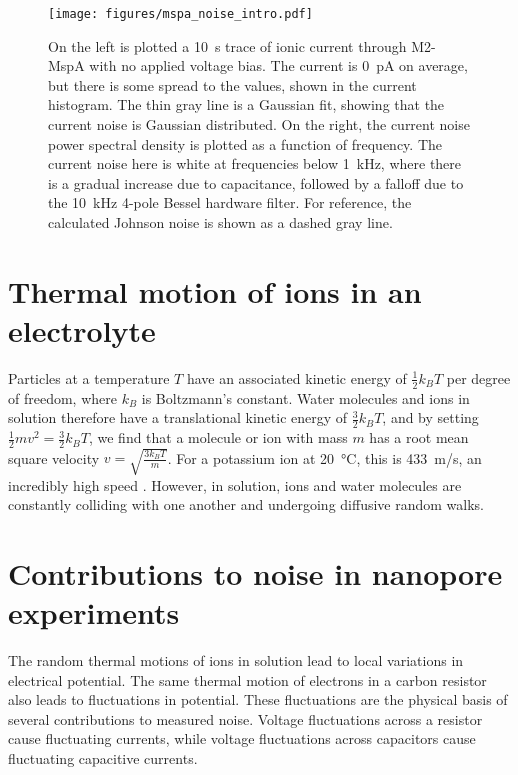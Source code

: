 \begin{figure}[h]
\begin{centering}
\texttt{[image: figures/mspa\_noise\_intro.pdf]}
\caption[Current noise in the MspA nanopore]{On the left is plotted a \SI{10}{\s} trace of ionic current through M2-MspA with no applied voltage bias.  The current is \SI{0}{\pA} on average, but there is some spread to the values, shown in the current histogram.  The thin gray line is a Gaussian fit, showing that the current noise is Gaussian distributed.  On the right, the current noise power spectral density is plotted as a function of frequency.  The current noise here is white at frequencies below \SI{1}{\kHz}, where there is a gradual increase due to capacitance, followed by a falloff due to the \SI{10}{\kHz} 4-pole Bessel hardware filter.  For reference, the calculated Johnson noise is shown as a dashed gray line.}
\label{fig:mspa_noise_intro}
\end{centering}
\end{figure}

\section{Thermal motion of ions in an electrolyte}

Particles at a temperature $T$ have an associated kinetic energy of $\frac{1}{2} k_B T$ per degree of freedom, where $k_B$ is Boltzmann's constant.  Water molecules and ions in solution therefore have a translational kinetic energy of $\frac{3}{2} k_B T$, and by setting $\frac{1}{2} mv^2 = \frac{3}{2} k_B T$, we find that a molecule or ion with mass $m$ has a root mean square velocity $v=\sqrt{\frac{3 k_B T}{m}}$.  For a potassium ion at \SI{20}{\celsius}, this is \SI{433}{\m/\s}, an incredibly high speed \citep{Hille2001}.  However, in solution, ions and water molecules are constantly colliding with one another and undergoing diffusive random walks.

\section{Contributions to noise in nanopore experiments}

The random thermal motions of ions in solution lead to local variations in electrical potential.  The same thermal motion of electrons in a carbon resistor also leads to fluctuations in potential.  These fluctuations are the physical basis of several contributions to measured noise.  Voltage fluctuations across a resistor cause fluctuating currents, while voltage fluctuations across capacitors cause fluctuating capacitive currents.

